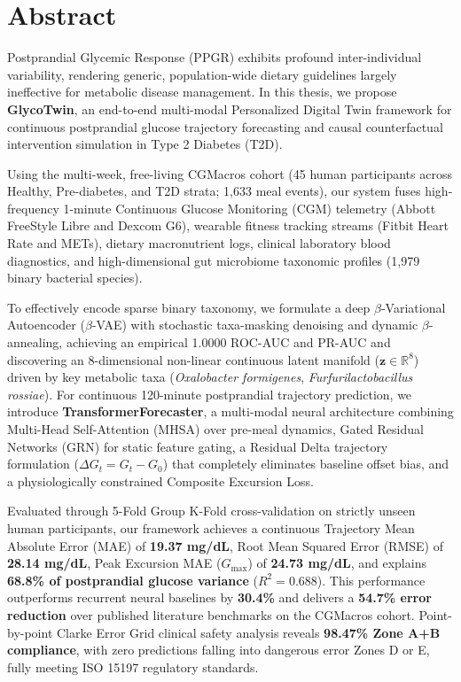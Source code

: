 \documentclass[a4paper, 12pt]{report}
\theoremstyle{definition}
\begin{document}
	\newpage

	\chapter*{Abstract}
	Postprandial Glycemic Response (PPGR) exhibits profound inter-individual variability, rendering generic, population-wide dietary guidelines largely ineffective for metabolic disease management. In this thesis, we propose \textbf{GlycoTwin}, an end-to-end multi-modal Personalized Digital Twin framework for continuous postprandial glucose trajectory forecasting and causal counterfactual intervention simulation in Type 2 Diabetes (T2D).

    Using the multi-week, free-living CGMacros cohort (45 human participants across Healthy, Pre-diabetes, and T2D strata; 1,633 meal events), our system fuses high-frequency 1-minute Continuous Glucose Monitoring (CGM) telemetry (Abbott FreeStyle Libre and Dexcom G6), wearable fitness tracking streams (Fitbit Heart Rate and METs), dietary macronutrient logs, clinical laboratory blood diagnostics, and high-dimensional gut microbiome taxonomic profiles (1,979 binary bacterial species).

    To effectively encode sparse binary taxonomy, we formulate a deep $\beta$-Variational Autoencoder ($\beta$-VAE) with stochastic taxa-masking denoising and dynamic $\beta$-annealing, achieving an empirical 1.0000 ROC-AUC and PR-AUC and discovering an 8-dimensional non-linear continuous latent manifold ($\mathbf{z} \in \mathbb{R}^8$) driven by key metabolic taxa (\emph{Oxalobacter formigenes}, \emph{Furfurilactobacillus rossiae}). For continuous 120-minute postprandial trajectory prediction, we introduce \textbf{TransformerForecaster}, a multi-modal neural architecture combining Multi-Head Self-Attention (MHSA) over pre-meal dynamics, Gated Residual Networks (GRN) for static feature gating, a Residual Delta trajectory formulation ($\Delta G_t = G_t - G_0$) that completely eliminates baseline offset bias, and a physiologically constrained Composite Excursion Loss.

    Evaluated through 5-Fold Group K-Fold cross-validation on strictly unseen human participants, our framework achieves a continuous Trajectory Mean Absolute Error (MAE) of \textbf{19.37 mg/dL}, Root Mean Squared Error (RMSE) of \textbf{28.14 mg/dL}, Peak Excursion MAE ($G_{\max}$) of \textbf{24.73 mg/dL}, and explains \textbf{68.8\% of postprandial glucose variance} ($R^2 = 0.688$). This performance outperforms recurrent neural baselines by \textbf{30.4\%} and delivers a \textbf{54.7\% error reduction} over published literature benchmarks on the CGMacros cohort. Point-by-point Clarke Error Grid clinical safety analysis reveals \textbf{98.47\% Zone A+B compliance}, with zero predictions falling into dangerous error Zones D or E, fully meeting ISO 15197 regulatory standards.
\end{document}
